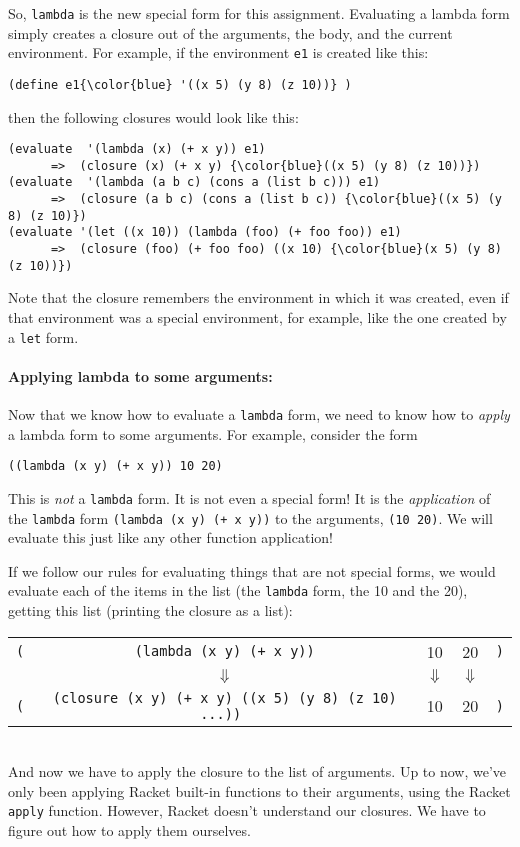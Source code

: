 \documentclass{article}
\begin{document}
So, {\tt lambda} is the new special form for this assignment.
Evaluating a lambda form simply creates a closure out of the
arguments, the body, and the current environment.
For example, if the environment {\tt e1}
is created like this:
\begin{Verbatim}[commandchars=\\\{\}]
(define e1{\color{blue} '((x 5) (y 8) (z 10))} )
\end{Verbatim}
then the following closures would look like this:
\begin{Verbatim}[frame=single,commandchars=\\\{\}]
(evaluate  '(lambda (x) (+ x y)) e1)
      =>  (closure (x) (+ x y) {\color{blue}((x 5) (y 8) (z 10))})
(evaluate  '(lambda (a b c) (cons a (list b c))) e1)
      =>  (closure (a b c) (cons a (list b c)) {\color{blue}((x 5) (y 8) (z 10)})
(evaluate '(let ((x 10)) (lambda (foo) (+ foo foo)) e1)
      =>  (closure (foo) (+ foo foo) ((x 10) {\color{blue}(x 5) (y 8) (z 10))})
\end{Verbatim}
Note that the closure remembers the environment in which it was
created, even if that environment was a special environment, for
example, like the one created by a {\tt let} form.

\paragraph{Applying lambda to some arguments:}

Now that we know how to evaluate a {\tt lambda} form, we need to know
how to {\em apply} a lambda form to some arguments.  For example,
consider the form
\begin{Verbatim}[frame=single]
  ((lambda (x y) (+ x y)) 10 20)
\end{Verbatim}
This is {\em not} a {\tt lambda} form.  It is not even a special form!
It is the {\em application} of
the {\tt lambda} form {\tt (lambda (x y) (+ x y))} to the arguments,
{\tt (10 20)}.  We will evaluate this just like any other
function application!

If we follow our rules for evaluating things that are
not special forms, we would evaluate each of the items in the list
(the {\tt lambda} form, the 10 and the 20), getting this list
(printing the closure as a list):\\
\begin{tabular}{|rcccl|}\hline
  {\tt (}&{\tt (lambda (x y) (+ x y))} & 10 & 20 & {\tt )}\\
         &  \ensuremath{\Downarrow} & \ensuremath{\Downarrow} & \ensuremath{\Downarrow} &\\
  {\tt (} & {\tt (closure (x y) (+ x y) {\color{blue}((x 5) (y 8) (z
      10) ...)}) } & 10 &  20& {\tt )}\\\hline
\end{tabular}\\
And now we have to apply the closure to the list of arguments.  Up to
now, we've only been applying Racket built-in functions to their
arguments, using the Racket {\tt apply} function.  However, Racket
doesn't understand our closures.  We have to figure out how to apply
them ourselves.
\end{document}
